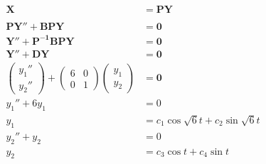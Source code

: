 \documentclass{article}
\begin{document}
\begin{enumerate}
        \begin{align*}
          \mathbf{X}                      & = \mathbf{P Y}                              \\ \\
          \mathbf{P Y'' + B P Y}          & = \mathbf{0}                                \\
          \mathbf{Y'' + P^{-1} B P Y}     & = \mathbf{0}                                \\
          \mathbf{Y'' + D Y}              & = \mathbf{0}                                \\
          \begin{pmatrix}
            y_1'' \\
            y_2''
          \end{pmatrix} + \begin{pmatrix}
                            6 & 0 \\
                            0 & 1
                          \end{pmatrix} \begin{pmatrix}
                                          y_1 \\
                                          y_2
                                        \end{pmatrix} & = \mathbf{0}                    \\
          y_1'' + 6 y_1                   & = 0                                         \\
          y_1                             & = c_1 \cos \sqrt{6} t + c_2 \sin \sqrt{6} t \\
          y_2'' + y_2                     & = 0                                         \\
          y_2                             & = c_3 \cos t + c_4 \sin t                   \\ \\
        \end{align*}


\end{enumerate}
\end{document}
